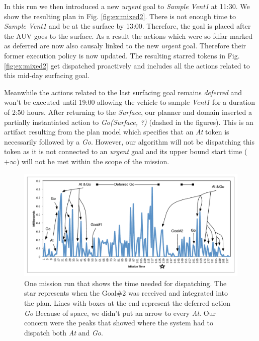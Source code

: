 In this run we then introduced a new {\em urgent} goal to {\em Sample
Vent1} at 11:30. We show the resulting plan in
Fig. \ref{fig:ex:mixed2}. There is not enough
time to {\em Sample Vent1} and be at the surface by 13:00. Therefore,
the goal is placed after the AUV goes to the surface. As a result the
actions which were so fdfar marked as deferred are now also causaly
linked to the new {\em urgent} goal. Therefore their former execution
policy is now updated. The resulting starred tokens in
Fig. \ref{fig:ex:mixed2} get dispatched proactively and includes all
the actions related to this mid-day surfacing goal.

Meanwhile the actions related to the last surfacing goal remains {\em
  deferred} and won't be executed until 19:00 allowing the vehicle to
sample {\em Vent1} for a duration of 2:50 hours.  After returning to the {\em
  Surface}, our planner and domain inserted a  partially instantiated
action to {\em Go(Surface, ?)} (dashed in the figures). 
This is an artifact resulting from the plan model which specifies that 
an {\em At} token is necessarily followed by a {\em Go}.
However, our algorithm will not be dispatching this token as it is not
connected to an {\em urgent} goal and its upper bound 
start time ($+\infty$) will not be met within the scope of the
mission. 

\begin{figure}[!htbp]
  \centering
  \includegraphics[width=\columnwidth]{figs/example_run.pdf}
  \caption{\small One mission run that shows the time needed for
    dispatching. The star represents when the Goal\#2 was received and
    integrated into the plan. Lines with boxes at the end represent
    the deferred action {\em Go} Because of space, we didn't put an
    arrow to every {\em At}. Our concern were the peaks that showed
    where the system had to dispatch both {\em At} and {\em Go}. }
  \label{fig:example_run}
\end{figure}


